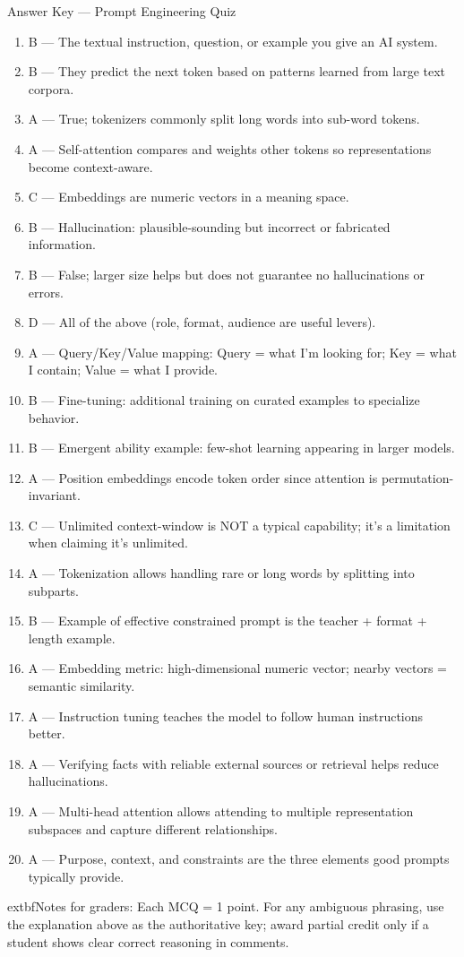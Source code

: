 \documentclass[11pt,a4paper]{article}
\begin{document}
\begin{center}
  {\LARGE Answer Key — Prompt Engineering Quiz}\\[6pt]
\end{center}
\vspace{0.5cm}
\begin{enumerate}
  \item B — The textual instruction, question, or example you give an AI system.
  \item B — They predict the next token based on patterns learned from large text corpora.
  \item A — True; tokenizers commonly split long words into sub-word tokens.
  \item A — Self-attention compares and weights other tokens so representations become context-aware.
  \item C — Embeddings are numeric vectors in a meaning space.
  \item B — Hallucination: plausible-sounding but incorrect or fabricated information.
  \item B — False; larger size helps but does not guarantee no hallucinations or errors.
  \item D — All of the above (role, format, audience are useful levers).
  \item A — Query/Key/Value mapping: Query = what I'm looking for; Key = what I contain; Value = what I provide.
  \item B — Fine-tuning: additional training on curated examples to specialize behavior.
  \item B — Emergent ability example: few-shot learning appearing in larger models.
  \item A — Position embeddings encode token order since attention is permutation-invariant.
  \item C — Unlimited context-window is NOT a typical capability; it's a limitation when claiming it's unlimited.
  \item A — Tokenization allows handling rare or long words by splitting into subparts.
  \item B — Example of effective constrained prompt is the teacher + format + length example.
  \item A — Embedding metric: high-dimensional numeric vector; nearby vectors = semantic similarity.
  \item A — Instruction tuning teaches the model to follow human instructions better.
  \item A — Verifying facts with reliable external sources or retrieval helps reduce hallucinations.
  \item A — Multi-head attention allows attending to multiple representation subspaces and capture different relationships.
  \item A — Purpose, context, and constraints are the three elements good prompts typically provide.
\end{enumerate}

\vspace{0.5cm}
  extbf{Notes for graders:} Each MCQ = 1 point. For any ambiguous phrasing, use the explanation above as the authoritative key; award partial credit only if a student shows clear correct reasoning in comments.
\end{document}
